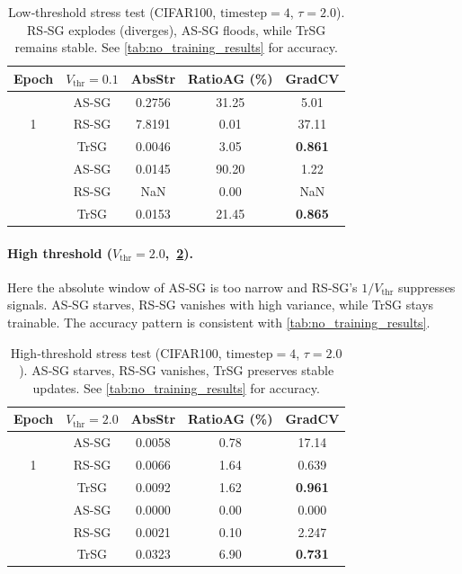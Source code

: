 \begin{table}[t]
\centering
\small
\begin{tabular}{ccccc}
\toprule
\textbf{Epoch} & \textbf{$V_{\text{thr}}{=}0.1$} & \textbf{AbsStr} & \textbf{RatioAG (\%)} & \textbf{GradCV} \\
\midrule
\multirow{3}{*}{1}   & AS-SG & 0.2756 & 31.25 & 5.01  \\
& RS-SG & 7.8191 & 0.01  & 37.11 \\
& TrSG  & 0.0046 & 3.05  & \textbf{0.861} \\
\addlinespace[2pt]
\midrule
\multirow{3}{*}{100} & AS-SG & 0.0145 & 90.20 & 1.22  \\
& RS-SG & NaN    & 0.00  & NaN   \\
& TrSG  & 0.0153 & 21.45 & \textbf{0.865} \\
\bottomrule
\end{tabular}
\caption{Low‑threshold stress test (CIFAR100, $\text{timestep}{=}4$, $\tau{=}2.0$). RS‑SG explodes (diverges), AS‑SG floods, while TrSG remains stable. See \cref{tab:no_training_results} for accuracy.}
\label{tab:metrics_low}
\end{table}

\paragraph{High threshold ($V_{\text{thr}}{=}2.0$,~\cref{tab:metrics_high}).}
Here the absolute window of AS‑SG is too narrow and RS‑SG’s $1/V_{\text{thr}}$ suppresses signals. AS‑SG starves, RS‑SG vanishes with high variance, while TrSG stays trainable. The accuracy pattern is consistent with \cref{tab:no_training_results}.

\begin{table}[t]
\centering
\small
\begin{tabular}{ccccc}
\toprule
\textbf{Epoch} & \textbf{$V_{\text{thr}}{=}2.0$} & \textbf{AbsStr} & \textbf{RatioAG (\%)} & \textbf{GradCV} \\
\midrule
\multirow{3}{*}{1} & AS-SG & 0.0058 & 0.78 & 17.14 \\
& RS-SG & 0.0066 & 1.64 & 0.639 \\
& TrSG  & 0.0092 & 1.62 & \textbf{0.961} \\
\midrule
\addlinespace[2pt]
\multirow{3}{*}{100} & AS-SG & 0.0000 & 0.00 & 0.000 \\
& RS-SG & 0.0021 & 0.10 & 2.247 \\
& TrSG  & 0.0323 & 6.90 & \textbf{0.731} \\
\bottomrule
\end{tabular}
\caption{High‑threshold stress test (CIFAR100, $\text{timestep}{=}4$, $\tau{=}2.0$). AS‑SG starves, RS‑SG vanishes, TrSG preserves stable updates. See \cref{tab:no_training_results} for accuracy.}
\label{tab:metrics_high}
\end{table}

